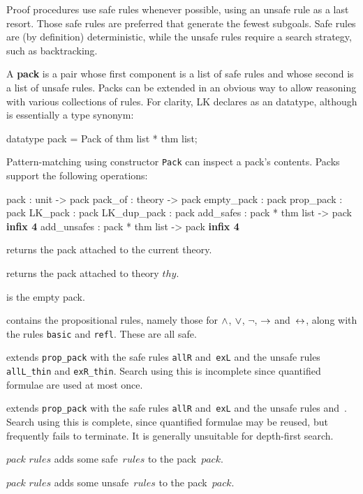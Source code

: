 Proof procedures use safe rules whenever possible, using an unsafe rule as a
last resort.  Those safe rules are preferred that generate the fewest
subgoals.  Safe rules are (by definition) deterministic, while the unsafe
rules require a search strategy, such as backtracking.

A \textbf{pack} is a pair whose first component is a list of safe rules and
whose second is a list of unsafe rules.  Packs can be extended in an obvious
way to allow reasoning with various collections of rules.  For clarity, LK
declares  as an \ML{} datatype, although is essentially a type
synonym:
\begin{ttbox}
datatype pack = Pack of thm list * thm list;
\end{ttbox}
Pattern-matching using constructor {\tt Pack} can inspect a pack's
contents.  Packs support the following operations:
\begin{ttbox} 
pack        : unit -> pack
pack_of     : theory -> pack
empty_pack  : pack
prop_pack   : pack
LK_pack     : pack
LK_dup_pack : pack
add_safes   : pack * thm list -> pack               \hfill\textbf{infix 4}
add_unsafes : pack * thm list -> pack               \hfill\textbf{infix 4}
\end{ttbox}
\begin{ttdescription}
\item[\ttindexbold{pack}] returns the pack attached to the current theory.

\item[\ttindexbold{pack_of $thy$}] returns the pack attached to theory $thy$.

\item[\ttindexbold{empty_pack}] is the empty pack.

\item[\ttindexbold{prop_pack}] contains the propositional rules, namely
those for $\wedge$, $\vee$, $\neg$, $\rightarrow$ and~$\leftrightarrow$, along with the
rules {\tt basic} and {\tt refl}.  These are all safe.

\item[\ttindexbold{LK_pack}] 
extends {\tt prop_pack} with the safe rules {\tt allR}
and~{\tt exL} and the unsafe rules {\tt allL_thin} and
{\tt exR_thin}.  Search using this is incomplete since quantified
formulae are used at most once.

\item[\ttindexbold{LK_dup_pack}] 
extends {\tt prop_pack} with the safe rules {\tt allR}
and~{\tt exL} and the unsafe rules  and~.
Search using this is complete, since quantified formulae may be reused, but
frequently fails to terminate.  It is generally unsuitable for depth-first
search.

\item[$pack$ \ttindexbold{add_safes} $rules$] 
adds some safe~$rules$ to the pack~$pack$.

\item[$pack$ \ttindexbold{add_unsafes} $rules$] 
adds some unsafe~$rules$ to the pack~$pack$.
\end{ttdescription}


